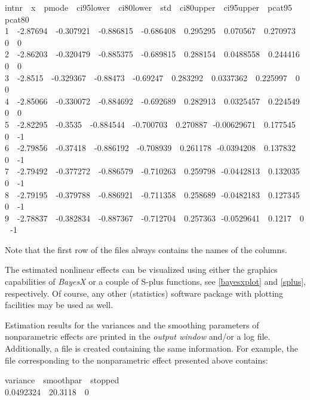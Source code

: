 \footnotesize
 intnr \,\, x \,\, pmode \,\, ci95lower \,\, ci80lower \,\, std \,\, ci80upper \,\, ci95upper \,\, pcat95 \,\, pcat80\\
 1 \,\, -2.87694 \,\, -0.307921 \,\, -0.886815 \,\, -0.686408 \,\, 0.295295 \,\, 0.070567   \,\, 0.270973 \,\, 0 \,\, 0\\
 2 \,\, -2.86203 \,\, -0.320479 \,\, -0.885375 \,\, -0.689815 \,\, 0.288154 \,\, 0.0488558  \,\, 0.244416 \,\, 0 \,\, 0\\
 3 \,\, -2.8515  \,\, -0.329367 \,\, -0.88473  \,\, -0.69247  \,\, 0.283292 \,\, 0.0337362  \,\, 0.225997 \,\, 0 \,\, 0\\
 4 \,\, -2.85066 \,\, -0.330072 \,\, -0.884692 \,\, -0.692689 \,\, 0.282913 \,\, 0.0325457  \,\, 0.224549 \,\, 0 \,\, 0\\
 5 \,\, -2.82295 \,\, -0.3535   \,\, -0.884544 \,\, -0.700703 \,\, 0.270887 \,\,-0.00629671 \,\, 0.177545 \,\, 0 \,\, -1\\
 6 \,\, -2.79856 \,\, -0.37418  \,\, -0.886192 \,\, -0.708939 \,\, 0.261178 \,\,-0.0394208  \,\, 0.137832 \,\, 0 \,\, -1\\
 7 \,\, -2.79492 \,\, -0.377272 \,\, -0.886579 \,\, -0.710263 \,\, 0.259798 \,\,-0.0442813  \,\, 0.132035 \,\, 0 \,\, -1\\
 8 \,\, -2.79195 \,\, -0.379788 \,\, -0.886921 \,\, -0.711358 \,\, 0.258689 \,\,-0.0482183  \,\, 0.127345 \,\, 0 \,\, -1\\
 9 \,\, -2.78837 \,\, -0.382834 \,\, -0.887367 \,\, -0.712704 \,\, 0.257363 \,\,-0.0529641  \,\, 0.1217   \,\, 0 \,\, -1
\normalsize

Note that the first row of the files always contains the names of
the columns.

The estimated nonlinear effects can be visualized using either the
graphics capabilities of {\em BayesX} or a couple of S-plus
functions,  see \autoref{bayesxplot} and \autoref{splus},
respectively. Of course, any other (statistics) software package
with plotting facilities may be used as well.

Estimation results for the variances and the smoothing parameters
of nonparametric effects are printed in the {\em output window}
and/or a log file. Additionally, a file is created containing the
same information. For example, the file corresponding to the
nonparametric effect presented above contains:

\footnotesize
 variance \,\, smoothpar \,\, stopped\\
 0.0492324 \,\, 20.3118 \,\, 0
\normalsize

